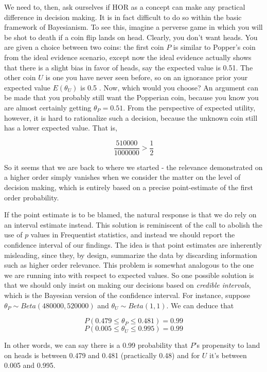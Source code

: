 We need to, then, ask ourselves if HOR as a concept can make any
practical difference in decision making. It is in fact difficult to do
so within the basic framework of Bayesianism. To see this, imagine a
perverse game in which you will be shot to death if a coin flip lands on
head. Clearly, you don't want heads. You are given a choice between two
coins: the first coin \(P\) is similar to Popper's coin from the ideal
evidence scenario, except now the ideal evidence actually shows that
there is a slight bias in favor of heads, say the expected value is
0.51. The other coin \(U\) is one you have never seen before, so on an
ignorance prior your expected value \(E(\theta_U)\) is 0.5 . Now, which
would you choose? An argument can be made that you probably still want
the Popperian coin, because you know you are almost certainly getting
\(\theta_P = 0.51\). From the perspective of expected utility, however,
it is hard to rationalize such a decision, because the unknown coin
still has a lower expected value. That is,

\[\frac{510000}{1000000}> \frac{1}{2}\]

So it seems that we are back to where we started - the relevance
demonstrated on a higher order simply vanishes when we consider the
matter on the level of decision making, which is entirely based on a
precise point-estimate of the first order probability.

If the point estimate is to be blamed, the natural response is that we
do rely on an interval estimate instead. This solution is reminiscent of
the call to abolish the use of \(p\) values in Frequentist statistics,
and instead we should report the confidence interval of our findings.
The idea is that point estimates are inherently misleading, since they,
by design, summarize the data by discarding information such as higher
order relevance. This problem is somewhat analogous to the one we are
running into with respect to expected values. So one possible solution
is that we should only insist on making our decisions based on
\emph{credible intervals}, which is the Bayesian version of the
confidence interval. For instance, suppose
\(\theta_P \sim Beta(480000,520000)\) and \(\theta_U \sim Beta(1,1)\).
We can deduce that

\[P(0.479\leq \theta_P \leq 0.481) = 0.99\]
\[P(0.005\leq \theta_U \leq 0.995) = 0.99\]

\noindent In other words, we can say there is a 0.99 probability that
\(P\)'s propensity to land on heads is between 0.479 and 0.481
(practically 0.48) and for \(U\) it's between 0.005 and 0.995.

